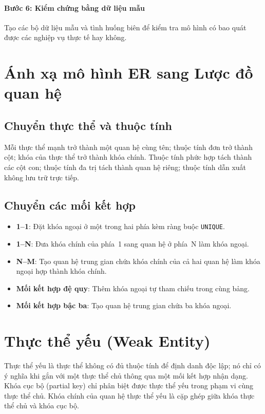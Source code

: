 \paragraph{Bước 6: Kiểm chứng bằng dữ liệu mẫu}
Tạo các bộ dữ liệu mẫu và tình huống biên để kiểm tra mô hình có bao quát được các nghiệp vụ thực tế hay không.

\section{Ánh xạ mô hình ER sang Lược đồ quan hệ}
\label{sec:anhxa_er}

\subsection{Chuyển thực thể và thuộc tính}
Mỗi thực thể mạnh trở thành một quan hệ cùng tên; thuộc tính đơn trở thành cột; khóa của thực thể trở thành khóa chính. Thuộc tính phức hợp tách thành các cột con; thuộc tính đa trị tách thành quan hệ riêng; thuộc tính dẫn xuất không lưu trữ trực tiếp.

\subsection{Chuyển các mối kết hợp}
\begin{itemize}
    \item \textbf{1--1}: Đặt khóa ngoại ở một trong hai phía kèm ràng buộc \texttt{UNIQUE}.
    \item \textbf{1--N}: Đưa khóa chính của phía~1 sang quan hệ ở phía~N làm khóa ngoại.
    \item \textbf{N--M}: Tạo quan hệ trung gian chứa khóa chính của cả hai quan hệ làm khóa ngoại hợp thành khóa chính.
    \item \textbf{Mối kết hợp đệ quy}: Thêm khóa ngoại tự tham chiếu trong cùng bảng.
    \item \textbf{Mối kết hợp bậc ba}: Tạo quan hệ trung gian chứa ba khóa ngoại.
\end{itemize}

\section{Thực thể yếu (Weak Entity)}
\label{sec:thuc_the_yeu}
Thực thể yếu là thực thể không có đủ thuộc tính để định danh độc lập; nó chỉ có ý nghĩa khi gắn với một thực thể chủ thông qua một mối kết hợp nhận dạng. Khóa cục bộ (partial key) chỉ phân biệt được thực thể yếu trong phạm vi cùng thực thể chủ. Khóa chính của quan hệ thực thể yếu là cặp ghép giữa khóa thực thể chủ và khóa cục bộ.

